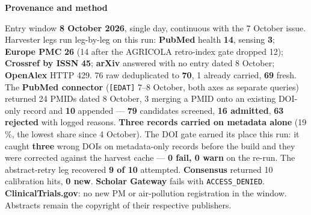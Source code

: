 \documentclass[10pt]{article}
\begin{document}


\vspace{2mm}

\begin{keybox}
{\sffamily\bfseries\footnotesize\color{Deep}Provenance and method}\\[1.2mm]
{\fontsize{7.2}{8.8}\selectfont
Entry window \textbf{8 October 2026}, single day, continuous with the 7 October issue. Harvester
legs run leg-by-leg on this run: \textbf{PubMed} health \textbf{14}, sensing \textbf{3}; \textbf{Europe
PMC} \textbf{26} (14 after the AGRICOLA retro-index gate dropped 12); \textbf{Crossref by ISSN}
\textbf{45}; \textbf{arXiv} answered with no entry dated 8 October; \textbf{OpenAlex} HTTP 429. 76 raw
deduplicated to \textbf{70}, 1 already carried, \textbf{69} fresh. The \textbf{PubMed connector}
(\texttt{[EDAT]} 7--8 October, both axes as separate queries) returned 24 PMIDs dated 8 October, 3 merging
a PMID onto an existing DOI-only record and \textbf{10} appended --- \textbf{79} candidates screened,
\textbf{16 admitted}, \textbf{63 rejected} with logged reasons. \textbf{Three records carried on metadata
alone} (19\,\%, the lowest share since 4 October). The DOI gate earned its place this run: it caught
\textbf{three} wrong DOIs on metadata-only records before the build and they were corrected against the
harvest cache --- \textbf{0 fail, 0 warn} on the re-run. The abstract-retry leg recovered \textbf{9 of
10} attempted. \textbf{Consensus} returned 10 calibration hits, \textbf{0 new}. \textbf{Scholar Gateway}
fails with \texttt{ACCESS\_DENIED}. \textbf{ClinicalTrials.gov}: no new PM or air-pollution registration
in the window. Abstracts remain the copyright of their respective publishers.\par}
\end{keybox}
\end{document}

